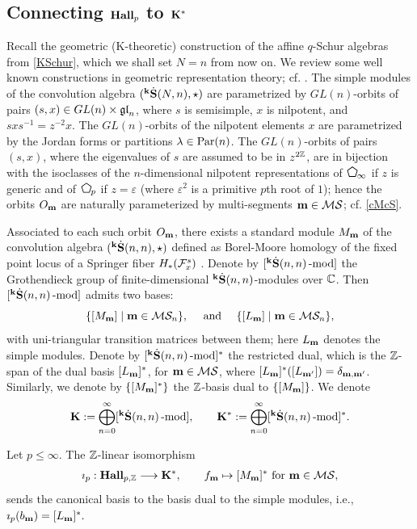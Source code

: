 \subsection{Connecting $\bold{Hall}_{p}$ to $\bf{K}^*$}

Recall the geometric (K-theoretic) construction of the affine $q$-Schur algebras from \eqref{KSchur}, which we shall set $N=n$ from now on. We review some well known constructions in geometric representation theory; cf. \cite{CG97, GV93, Lus91, Lus98, AJL}. The simple modules of the convolution algebra $({}^{\bold{k}}\dot{\bold{S}}(N,n), \star)$ are parametrized by $GL(n)$-orbits of pairs $(s,x) \in GL(n) \times \mathfrak{gl}_n$, where $s$ is semisimple, $x$ is nilpotent, and $sxs^{-1} =z^{-2}x$. The $GL(n)$-orbits of the nilpotent elements $x$ are parametrized by the Jordan forms or partitions $\lambda \in \text{Par}(n)$. The $GL(n)$-orbits of pairs $(s,x)$, where the eigenvalues of $s$ are assumed to be in $z^{2\mathbb{Z}}$, are in bijection with the isoclasses of the $n$-dimensional nilpotent representations of $\peni$ if $z$ is generic and of $\penp$ if $z =\varepsilon$ (where $\varepsilon^2$ is a primitive $p$th root of $1$); hence the orbits $O_{\mathbf{m}}$ are naturally parameterized by multi-segments $\mathbf{m}\in\mathcal{M}\mathcal{S}$;  cf. \eqref{cMcS}.  

Associated to each such orbit $O_{\mathbf{m}}$, there exists a standard module $M_{\mathbf{m}}$ of the convolution algebra $({}^{\bold{k}}\dot{\bold{S}}(n,n), \star)$ defined as Borel-Moore homology of the fixed point locus of a Springer fiber $H_*(\mathcal{F}_x^s)$ \cite{CG97, GV93}. Denote by $[{}^{\bold{k}}\dot{\bold{S}}(n,n)\operatorname{-mod}\nolimits]$ the Grothendieck group of finite-dimensional ${}^{\bold{k}}\dot{\bold{S}}(n,n)$-modules over $\mathbb{C}$. Then $[{}^{\bold{k}}\dot{\bold{S}}(n,n)\operatorname{-mod}\nolimits]$ admits two bases: 
\[
\{[M_{\mathbf{m}}] \mid \mathbf{m}\in \mathcal{M}\mathcal{S}_n\},
\quad \text{ and } \quad
\{[L_{\mathbf{m}}] \mid \mathbf{m}\in \mathcal{M}\mathcal{S}_n\}, 
\]
with uni-triangular transition matrices between them; here $L_{\mathbf{m}}$ denotes the simple modules. Denote by $[{}^{\bold{k}}\dot{\bold{S}}(n,n)\operatorname{-mod}\nolimits]^*$ the restricted dual, which is the $\mathbb{Z}$-span of the dual basis $[L_{\mathbf{m}}]^*$, for $\mathbf{m}\in\mathcal{M}\mathcal{S}$, where $[L_{\mathbf{m}}]^* ([L_{\mathbf{m}'}]) =\delta_{\mathbf{m},\mathbf{m}'}$. Similarly, we denote by $\{[M_{\mathbf{m}}]^*\}$ the $\mathbb{Z}$-basis dual to $\{[M_{\mathbf{m}}]\}$. We denote 
\begin{align} \label{eq:KK}
{\bf{K}} :=\bigoplus_{n=0}^\infty [{}^{\bold{k}}\dot{\bold{S}}(n,n)\operatorname{-mod}\nolimits],
\qquad
{\bf{K}}^* :=\bigoplus_{n=0}^\infty [{}^{\bold{k}}\dot{\bold{S}}(n,n)\operatorname{-mod}\nolimits]^*.
\end{align}

\begin{theorem} 
\label{thm:Hall=Schursimple}
Let $p\le \infty$. 
    The $\mathbb{Z}$-linear isomorphism 
    \begin{align*}
        \imath_p: \bold{Hall}_{p,\mathbb{Z}} \longrightarrow {\bf{K}}^*,  \qquad
        f_{\mathbf{m}} \mapsto [M_{\mathbf{m}}]^*
        \textrm{ for } \mathbf{m} \in \mathcal{M}\mathcal{S},
    \end{align*}
sends the canonical basis to the basis dual to the simple modules, i.e., $\imath_p(b_{\mathbf{m}}) =[L_{\mathbf{m}}]^*.$
\end{theorem}


